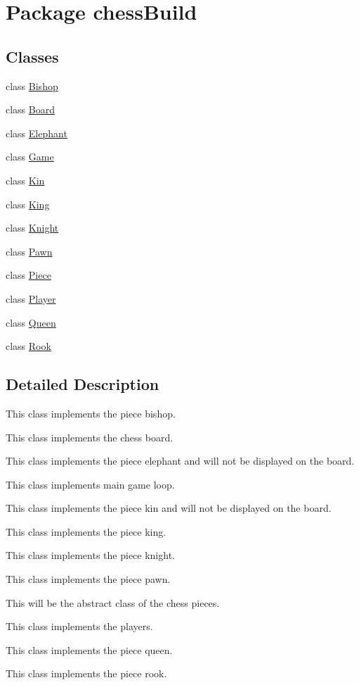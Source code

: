 \hypertarget{namespacechess_build}{}\section{Package chess\+Build}
\label{namespacechess_build}
\subsection*{Classes}
\begin{DoxyCompactItemize}
\item 
class \hyperlink{classchess_build_1_1_bishop}{Bishop}
\item 
class \hyperlink{classchess_build_1_1_board}{Board}
\item 
class \hyperlink{classchess_build_1_1_elephant}{Elephant}
\item 
class \hyperlink{classchess_build_1_1_game}{Game}
\item 
class \hyperlink{classchess_build_1_1_kin}{Kin}
\item 
class \hyperlink{classchess_build_1_1_king}{King}
\item 
class \hyperlink{classchess_build_1_1_knight}{Knight}
\item 
class \hyperlink{classchess_build_1_1_pawn}{Pawn}
\item 
class \hyperlink{classchess_build_1_1_piece}{Piece}
\item 
class \hyperlink{classchess_build_1_1_player}{Player}
\item 
class \hyperlink{classchess_build_1_1_queen}{Queen}
\item 
class \hyperlink{classchess_build_1_1_rook}{Rook}
\end{DoxyCompactItemize}


\subsection{Detailed Description}
This class implements the piece bishop.

This class implements the chess board.

This class implements the piece elephant and will not be displayed on the board.

This class implements main game loop.

This class implements the piece kin and will not be displayed on the board.

This class implements the piece king.

This class implements the piece knight.

This class implements the piece pawn.

This will be the abstract class of the chess pieces.

This class implements the players.

This class implements the piece queen.

This class implements the piece rook. 